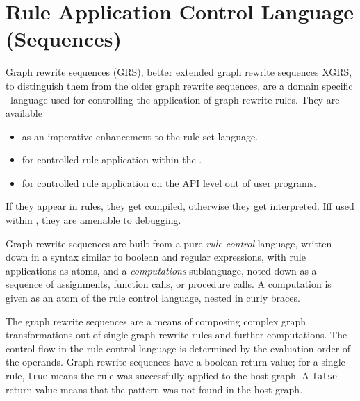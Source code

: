 \chapter{Rule Application Control Language (Sequences)}
\label{cha:xgrs}

Graph rewrite sequences (GRS), better extended graph rewrite sequences XGRS, to distinguish them from the older graph rewrite sequences, are a domain specific \GrG~language used for controlling the application of graph rewrite rules. 
They are available
\begin{itemize}
\item as an imperative enhancement to the rule set language.
\item for controlled rule application within the \GrShell.
\item for controlled rule application on the API level out of user programs.
\end{itemize}

If they appear in rules, they get compiled, otherwise they get interpreted.
Iff used within \GrShell, they are amenable to debugging.

Graph rewrite sequences are built from a pure \emph{rule control} language,
written down in a syntax similar to boolean and regular expressions, with rule applications as atoms,
and a \emph{computations} sublanguage,
noted down as a sequence of assignments, function calls, or procedure calls.
A computation is given as an atom of the rule control language, nested in curly braces.

The graph rewrite sequences are a means of composing complex graph transformations out of single graph rewrite rules and further computations.
The control flow in the rule control language is determined by the evaluation order of the operands.
Graph rewrite sequences have a boolean return value; for a single rule, \texttt{true} means the rule was successfully applied to the host graph.
A \texttt{false} return value means that the pattern was not found in the host graph. 

